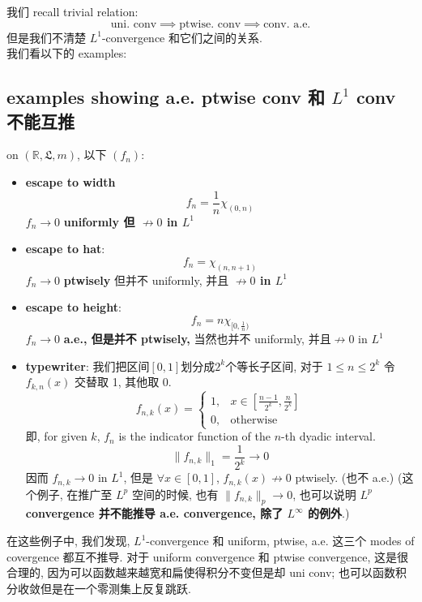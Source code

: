 \documentclass[lang=cn,11pt]{elegantbook}
\begin{document}
我们 recall trivial relation: \[
\text{uni. conv} \implies \text{ptwise. conv} \implies \text{conv. a.e.}
\]
但是我们不清楚 $L^1$-convergence 和它们之间的关系.\\
我们看以下的 examples: 

\subsection{examples showing a.e. ptwise conv 和 $L^1$ conv 不能互推 }
\begin{example}
    on $(\mathbb{R}, \mathfrak{L}, m)$, 以下 $(f_n)$:
    \begin{itemize}
        \item \textbf{escape to width }$$f_n = \frac{1}{n} \chi_{(0,n)}$$
        $f_n \rightarrow 0$\textbf{ uniformly 但 $\not\rightarrow 0$ in $L^1$}

        \item \textbf{escape to hat}: $$f_n = \chi_{(n,n+1)}$$
        $f_n \rightarrow 0$ \textbf{ptwisely} 但并不 uniformly, 并且\textbf{ $\not\rightarrow 0$ in $L^1$}

        \item \textbf{escape to height}: $$f_n = n \chi_{[0,\frac{1}{n})}$$
        $f_n \rightarrow 0$ \textbf{a.e., 但是并不 ptwisely,} 当然也并不 uniformly, 并且$\not\rightarrow 0$ in $L^1$
        
        \item \textbf{typewriter}: 我们把区间$[0,1]$划分成$2^k$个等长子区间, 对于 $1\leq n \leq 2^k$ 令 $f_{k,n}(x)$  交替取 1, 其他取 0. 
\[
f_{n,k}(x) = \begin{cases}
1, & x \in \left[\frac{n-1}{2^k}, \frac{n}{2^k}\right] \\
0, & \text{otherwise}
\end{cases}
\]
即, for given $k$, \( f_n \) is the indicator function of the \( n \)-th dyadic interval. \[
   \| f_{n,k} \|_1  = \frac{1}{2^k} \to 0
   \] 因而 $ f_{n,k} \rightarrow 0$ in $L^1$, 但是 $\forall x\in[0,1]$, $ f_{n,k}(x)\not\rightarrow 0$ ptwisely. (也不 a.e.)
(这个例子, 在推广至 $L^p$ 空间的时候, 也有 $ \| f_{n,k} \|_p \rightarrow 0$, 也可以说明 \textbf{$L^p$ convergence 并不能推导 a.e. convergence, 除了 $L^\infty$ 的例外}.)
    \end{itemize}
\end{example}

在这些例子中, 我们发现, $L^1$-convergence 和 uniform, ptwise, a.e. 这三个 modes of covergence 都互不推导. 对于 uniform convergence 和 ptwise convergence, 这是很合理的, 因为可以函数越来越宽和扁使得积分不变但是却 uni conv; 也可以函数积分收敛但是在一个零测集上反复跳跃.\\
\end{document}
